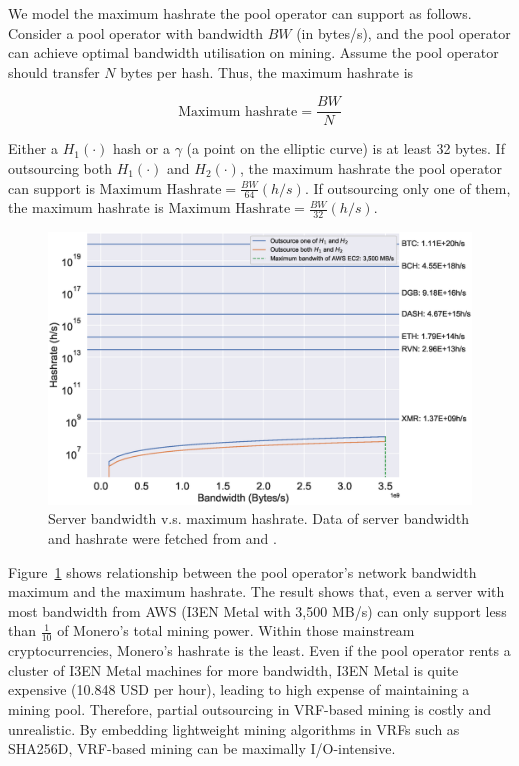 We model the maximum hashrate the pool operator can support as follows.
Consider a pool operator with bandwidth $BW$ (in bytes/s), and the pool operator can achieve optimal bandwidth utilisation on mining.
Assume the pool operator should transfer $N$ bytes per hash.
Thus, the maximum hashrate is

$$\text{Maximum hashrate} = \frac{BW}{N}$$

Either a $H_1(\cdot)$ hash or a $\gamma$ (a point on the elliptic curve) is at least 32 bytes.
If outsourcing both $H_1(\cdot)$ and $H_2(\cdot)$, the maximum hashrate the pool operator can support is $\text{Maximum Hashrate} = \frac{BW}{64} (h/s)$.
If outsourcing only one of them, the maximum hashrate is $\text{Maximum Hashrate} = \frac{BW}{32} (h/s)$.

\begin{figure}[htp]
    \centering
    \includegraphics[width=.8\linewidth]{figs/max-hashrate.eps}
    \caption{Server bandwidth v.s. maximum hashrate.
    Data of server bandwidth and hashrate were fetched from \cite{aws} and \cite{coinwarz}.}
    \label{fig:max-hashrate}
\end{figure}

Figure~\ref{fig:max-hashrate} shows relationship between the pool operator's network bandwidth maximum and the maximum hashrate.
The result shows that, even a server with most bandwidth from AWS (I3EN Metal with 3,500 MB/s) can only support less than $\frac{1}{10}$ of Monero's total mining power.
Within those mainstream cryptocurrencies, Monero's hashrate is the least.
Even if the pool operator rents a cluster of I3EN Metal machines for more bandwidth, I3EN Metal is quite expensive (10.848 USD per hour), leading to high expense of maintaining a mining pool.
Therefore, partial outsourcing in VRF-based mining is costly and unrealistic.
By embedding lightweight mining algorithms in VRFs such as SHA256D, VRF-based mining can be maximally I/O-intensive.
